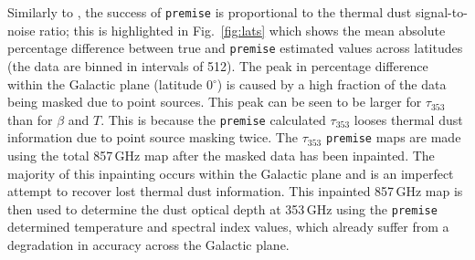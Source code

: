 \documentclass[a4paper,fleqn,usenatbib]{mnras}
\begin{document}
{Similarly to \citet{gnilc}, the success of {\texttt{premise}} is proportional to the thermal dust signal-to-noise ratio; this is highlighted in Fig.~\ref{fig:lats} which shows the mean absolute percentage difference between true and {\texttt{premise}} estimated values across latitudes (the data are binned in intervals of 512). The peak in percentage difference within the Galactic plane (latitude 0$^{\circ}$) is caused by a high fraction of the data being masked due to point sources. This peak can be seen to be larger for $\tau_{353}$ than for $\beta$ and $T$. This is because the {\texttt{premise}} calculated $\tau_{353}$ looses thermal dust information due to point source masking twice. The $\tau_{353}$ {\texttt{premise}} maps are made using the total 857\,GHz map after the masked data has been inpainted. The majority of this inpainting occurs within the Galactic plane and is an imperfect attempt to recover lost thermal dust information. This inpainted 857\,GHz map is then used to determine the dust optical depth at 353\,GHz using the {\texttt{premise}} determined temperature and spectral index values, which already suffer from a degradation in accuracy across the Galactic plane.




}
\end{document}
